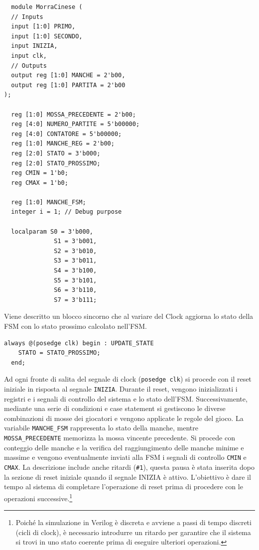 \documentclass[a4paper]{report}
\begin{document}
\begin{lstlisting}
  module MorraCinese (
  // Inputs
  input [1:0] PRIMO,
  input [1:0] SECONDO,
  input INIZIA,
  input clk,
  // Outputs
  output reg [1:0] MANCHE = 2'b00,
  output reg [1:0] PARTITA = 2'b00
);

  reg [1:0] MOSSA_PRECEDENTE = 2'b00;
  reg [4:0] NUMERO_PARTITE = 5'b00000;
  reg [4:0] CONTATORE = 5'b00000;
  reg [1:0] MANCHE_REG = 2'b00;
  reg [2:0] STATO = 3'b000;
  reg [2:0] STATO_PROSSIMO;
  reg CMIN = 1'b0;
  reg CMAX = 1'b0;

  reg [1:0] MANCHE_FSM;
  integer i = 1; // Debug purpose

  localparam S0 = 3'b000,
              S1 = 3'b001,
              S2 = 3'b010,
              S3 = 3'b011,
              S4 = 3'b100,
              S5 = 3'b101,
              S6 = 3'b110,
              S7 = 3'b111;

\end{lstlisting}

\vspace{20pt}

Viene descritto un blocco sincorno che al variare del Clock aggiorna lo stato della FSM con lo stato prossimo calcolato nell'FSM.

\begin{lstlisting}[firstnumber=34]
  always @(posedge clk) begin : UPDATE_STATE
    STATO = STATO_PROSSIMO;
  end;

\end{lstlisting}


\vspace{20pt}

Ad ogni fronte di salita del segnale di clock (\texttt{posedge clk}) si procede con il reset iniziale in risposta al segnale \texttt{INIZIA}.
Durante il reset, vengono inizializzati i registri e i segnali di controllo del sistema e lo stato dell'FSM.
Successivamente, mediante una serie di condizioni e case statement si gestiscono le diverse combinazioni di mosse dei giocatori e vengono applicate le regole del gioco.
La variabile \texttt{MANCHE\_FSM} rappresenta lo stato della manche, mentre \texttt{MOSSA\_PRECEDENTE} memorizza la mossa vincente precedente.
Si procede con conteggio delle manche e la verifica del raggiungimento delle manche minime e massime e vengono eventualmente inviati alla FSM i segnali di controllo \texttt{CMIN} e \texttt{CMAX}.
La descrizione include anche ritardi (\texttt{\#1}), questa pausa è stata inserita dopo la sezione di reset iniziale quando il segnale INIZIA è attivo.
L'obiettivo è dare il tempo al sistema di completare l'operazione di reset prima di procedere con le operazioni successive.\footnote{Poiché la simulazione in Verilog è discreta e avviene a passi di tempo discreti (cicli di clock), è necessario introdurre un ritardo per garantire che il sistema si trovi in uno stato coerente prima di eseguire ulteriori operazioni.}
\end{document}
